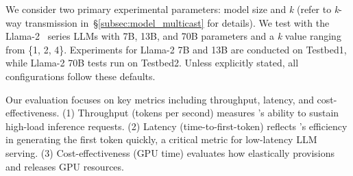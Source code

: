 We consider two primary experimental parameters: model size and \emph{k} (refer to \emph{k}-way transmission in~\S\ref{subsec:model_multicast} for details).
We test \SysName with the Llama-2~\cite{llama2} series LLMs with 7B, 13B, and 70B parameters and a \emph{k} value ranging from \{1, 2, 4\}. 
Experiments for Llama-2 7B and 13B are conducted on Testbed1, while Llama-2 70B tests run on Testbed2. Unless explicitly stated, all configurations follow these defaults. 

Our evaluation focuses on key metrics including throughput, latency, and cost-effectiveness.
(1) Throughput (tokens per second) measures \SysName's ability to sustain high-load inference requests.
(2) Latency (time-to-first-token) reflects \SysName's efficiency in generating the first token quickly,
a critical metric for low-latency LLM serving.
(3) Cost-effectiveness (GPU time) evaluates how elastically \SysName provisions and releases GPU resources. 



